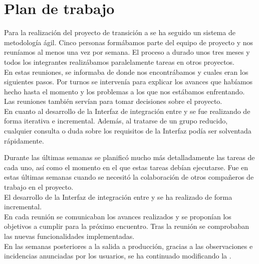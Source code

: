 \section{Plan de trabajo}

Para la realización del proyecto de transición a \wday{} se ha seguido un sistema de metodología ágil. 
Cinco personas formábamos parte del equipo de proyecto y nos reuníamos al menos una vez por semana.
El proceso a durado unos tres meses y todos los integrantes realizábamos paralelamente tareas en otros proyectos.\\

En estas reuniones, se informaba de donde nos encontrábamos y cuales eran los siguientes pasos.
Por turnos se intervenía para explicar los avances que habíamos hecho hasta el momento y los problemas a los que nos estábamos enfrentando.
Las reuniones también servían para tomar decisiones sobre el proyecto.\\

En cuanto al desarrollo de la Interfaz de integración entre \hs{} y \wday{} se fue realizando de forma iterativa e incremental. 
Además, al tratarse de un grupo reducido, cualquier consulta o duda sobre los requisitos de la Interfaz podía ser solventada rápidamente.

Durante las últimas semanas se planificó mucho más detalladamente las tareas de cada uno, así como el momento en el que estas tareas debían ejecutarse.
Fue en estas últimas semanas cuando se necesitó la colaboración de otros compañeros de trabajo en el proyecto.\\

El desarrollo de la Interfaz de integración entre \hs{} y \wday{} se ha realizado de forma incremental.\\

En cada reunión se comunicaban los avances realizados y se proponían los objetivos a cumplir para la próximo encuentro. Tras la reunión se comprobaban las nuevas funcionalidades implementadas.\\

En las semanas posteriores a la salida a producción, gracias a las observaciones e incidencias anunciadas por los usuarios,
se ha continuado modificando la \iface{}. 

